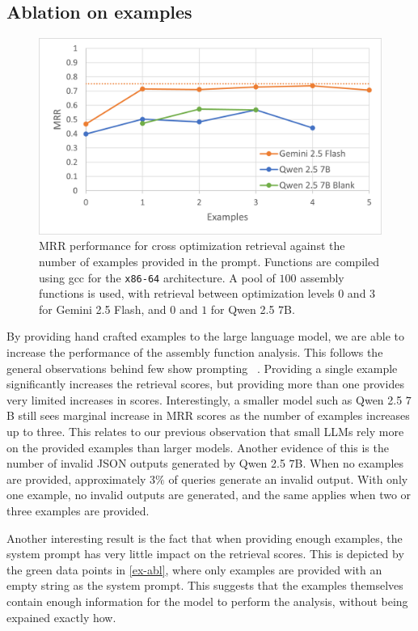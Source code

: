 \subsection{Ablation on examples}

\begin{figure}[]
\centerline{\includegraphics[width=\linewidth]{examples-ablation}}
\caption{MRR performance for cross optimization retrieval against the number of examples provided in the prompt. Functions are compiled
using gcc for the \texttt{x86-64} architecture. A pool of \(100\) assembly functions is used, with retrieval between optimization levels \(0\) and \(3\)
for Gemini 2.5 Flash, and \(0\) and \(1\) for Qwen 2.5 \(7\)B.}
\label{ex-abl}
\end{figure}

By providing hand crafted examples to the large language model, we are able to increase the performance of the assembly function analysis.
This follows the general observations behind few show prompting ~\cite{few-shot}. Providing a single example significantly increases the retrieval
scores, but providing more than one provides very limited increases in scores. Interestingly, a smaller model such as Qwen 2.5 \(7\)B still sees
marginal increase in MRR scores as the number of examples increases up to three. This relates to our previous observation
that small LLMs rely more on the provided examples than larger models. Another evidence of this is the number of invalid JSON outputs generated by
Qwen 2.5 \(7\)B. When no examples are provided, approximately \(3\%\) of queries generate an invalid output. With only one example, no invalid
outputs are generated, and the same applies when two or three examples are provided.

Another interesting result is the fact that when providing enough examples, the system prompt has very little impact on the retrieval scores.
This is depicted by the green data points in \autoref{ex-abl}, where only examples are provided with an empty string as the system prompt.
This suggests that the examples themselves contain enough information for the model to perform the analysis, without being expained 
exactly how.

